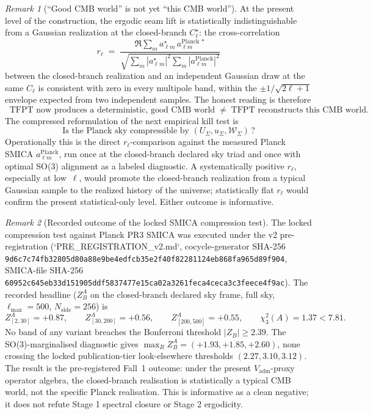 \documentclass[11pt,a4paper]{article}
\theoremstyle{definition}
\theoremstyle{remark}
\newtheorem*{remark}{Remark}
\begin{document}
\begin{remark}[``Good CMB world'' is not yet ``this CMB world'']
\label{rem:good-vs-this-cmb-world}
At the present level of the construction, the ergodic seam lift is statistically indistinguishable
from a Gaussian realization at the closed-branch $C_\ell^\star$: the cross-correlation
\[
r_\ell\;=\;\frac{\Re\sum_m a_{\ell m}^{\star}\,a_{\ell m}^{\mathrm{Planck}\,\ast}}
{\sqrt{\sum_m|a_{\ell m}^{\star}|^2\sum_m|a_{\ell m}^{\mathrm{Planck}}|^2}}
\]
between the closed-branch realization and an independent Gaussian draw at the same $C_\ell$ is
consistent with zero in every multipole band, within the $\pm1/\sqrt{2\ell+1}$ envelope expected
from two independent samples. The honest reading is therefore
\[
\boxed{\;
\text{TFPT now produces a deterministic, good CMB world}
\;\;\neq\;\;
\text{TFPT reconstructs this CMB world.}
\;}
\]
The compressed reformulation of the next empirical kill test is
\[
\boxed{\;
\text{Is the Planck sky compressible by }(U_\Sigma,u_\Sigma,\mathcal W_\Sigma)\,?
\;}
\]
Operationally this is the direct $r_\ell$-comparison against the measured Planck SMICA
$a_{\ell m}^{\mathrm{Planck}}$, run once at the closed-branch declared sky triad and once with
optimal SO(3) alignment as a labeled diagnostic. A systematically positive $r_\ell$, especially at
low~$\ell$, would promote the closed-branch realization from a typical Gaussian sample to the
realized history of the universe; statistically flat $r_\ell$ would confirm the present
statistical-only level. Either outcome is informative.
\end{remark}

\begin{remark}[Recorded outcome of the locked SMICA compression test]
\label{rem:smica-v2-result}
The locked compression test against Planck PR3 SMICA was executed under the v2
pre-registration (`PRE\_REGISTRATION\_v2.md`,
cocycle-generator SHA-256
\texttt{9d6c7c74fb32805d80a88e9be4edfcb35e2f40f82281124eb868fa965d89f904},
SMICA-file SHA-256
\texttt{60952c645eb33d151905ddf5837477e15ca02a3261feca4ceca3c3feece4f9ac}).
The recorded headline ($Z_B^A$ on the closed-branch declared sky frame, full sky,
$\ell_{\max}=500$, $N_{\mathrm{side}}=256$) is
\[
Z_{[2,30]}^A=+0.87,\qquad
Z_{[30,200]}^A=+0.56,\qquad
Z_{[200,500]}^A=+0.55,
\qquad\chi_3^2(A)=1.37<7.81.
\]
No band of any variant breaches the Bonferroni threshold $|Z_B|\ge 2.39$. The SO(3)-marginalised
diagnostic gives $\max_R Z_B^A=(+1.93,+1.85,+2.60)$, none crossing the locked publication-tier
look-elsewhere thresholds $(2.27,3.10,3.12)$. The result is the pre-registered Fall~1 outcome:
under the present $V_{\mathrm{adm}}$-proxy operator algebra, the closed-branch realisation is
statistically a typical CMB world, not the specific Planck realisation. This is informative as a
clean negative; it does not refute Stage 1 spectral closure or Stage 2 ergodicity.
\end{remark}
\end{document}
